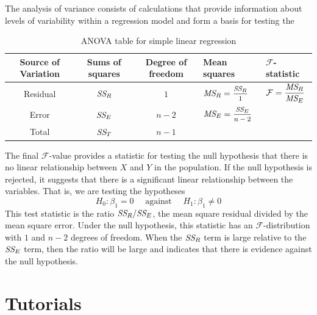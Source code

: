 The analysis of variance consists of calculations that provide information about levels of variability within a regression 
model and form a basis for testing the 

\begin{table}[h!]
\renewcommand{\arraystretch}{1.2}
\begin{tabularx}{\textwidth}{cc c p{2.5cm} p{2.5cm}}
    \toprule
    Source of Variation & Sums of squares & Degree of freedom & Mean squares & $\mathcal{F}$-statistic \\[0.6em]
    \midrule
    Residual & $\textit{SS}_{R}$ & $1$ & $\MS{R} = \mfrac{\CS{R}}{1}$ & $\displaystyle \mathcal{F} = \frac{\textit{MS}_{R} }{\textit{MS}_{E} }$ \\[0.6em]
    Error & $\textit{SS}_{E}$ & $n-2$ & $\MS{E} = \mfrac{\CS{E}}{n-2}$ & \\[0.6em]
    \hline
    Total & $\textit{SS}_{T}$ & $n - 1$ & & \\
    \bottomrule
\end{tabularx}
\caption{ANOVA table for simple linear regression}
\end{table}

The final $\mathcal{F}$-value provides a statistic for testing the null hypothesis that there is no linear relationship between $X$ and $Y$ in the population. If the null hypothesis is rejected, it suggests that there is a significant linear relationship between the variables.
That is, we are testing the hypotheses 
\[
    H_0: \beta_1 = 0 \quad \text{ against } \quad H_1: \beta_1 \neq 0
\]
This test statistic is the ratio $\textit{SS}_{R} / \textit{SS}_{E}$, the mean square residual divided by the mean square error. 
Under the null hypothesis, this statistic has an $\mathcal{F}$-distribution with $1$ and $n-2$ degrees of freedom. When the 
$\textit{SS}_{R}$ term is large relative to the $\textit{SS}_{E}$ term, then the ratio will be large and indicates 
that there is evidence against the null hypothesis.

\section*{Tutorials}

